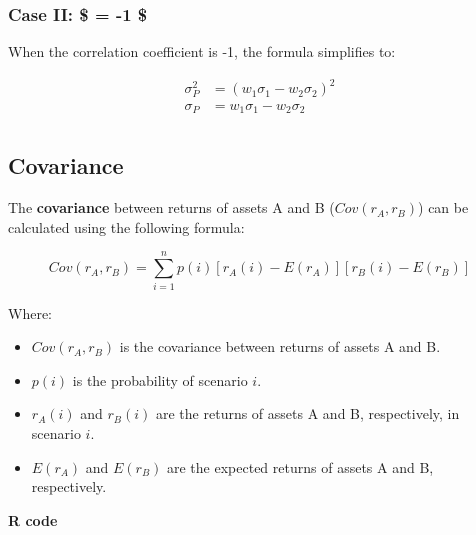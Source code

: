 \documentclass[
]{book}
\providecommand{\tightlist}{%
  \setlength{\itemsep}{0pt}\setlength{\parskip}{0pt}}
\begin{document}
\hypertarget{case-ii--1}{%
\subsubsection{\texorpdfstring{Case II: \$ \rho = -1 \$}{Case II: \$ = -1 \$}}\label{case-ii--1}}

When the correlation coefficient is -1, the formula simplifies to:

\[
\begin{aligned}
\sigma_P^2 &= (w_1 \sigma_1 - w_2 \sigma_2)^2 \\
\sigma_P  &= w_1 \sigma_1 - w_2 \sigma_2 \\
\end{aligned}
\]

\hypertarget{covariance}{%
\subsection{Covariance}\label{covariance}}

The \textbf{covariance} between returns of assets A and B (\(Cov(r_A, r_B)\)) can be calculated using the following formula:

\[Cov(r_A, r_B) = \sum_{i=1}^{n} p(i)[r_A(i) - E(r_A)][r_B(i) - E(r_B)]\]

Where:

\begin{itemize}
\tightlist
\item
  \(Cov(r_A, r_B)\) is the covariance between returns of assets A and B.
\item
  \(p(i)\) is the probability of scenario \(i\).
\item
  \(r_A(i)\) and \(r_B(i)\) are the returns of assets A and B, respectively, in scenario \(i\).
\item
  \(E(r_A)\) and \(E(r_B)\) are the expected returns of assets A and B, respectively.
\end{itemize}

\textbf{R code}
\end{document}
